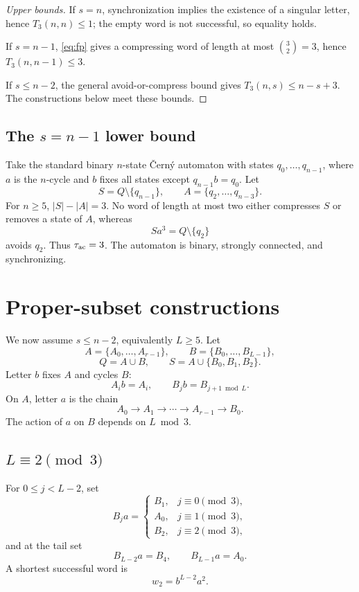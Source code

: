 \documentclass[11pt]{article}
\theoremstyle{definition}
\theoremstyle{remark}
\newcommand{\tauac}{\tau_{\rm ac}}
\begin{document}
\begin{proof}[Upper bounds]
If $s=n$, synchronization implies the existence of a singular letter, hence $T_3(n,n)\le1$; the empty word is not successful, so equality holds.

If $s=n-1$, \eqref{eq:fp} gives a compressing word of length at most $\binom32=3$, hence $T_3(n,n-1)\le3$.

If $s\le n-2$, the general avoid-or-compress bound gives $T_3(n,s)\le n-s+3$. The constructions below meet these bounds.
\end{proof}

\subsection{The $s=n-1$ lower bound}
Take the standard binary $n$-state \v{C}ern\'y automaton with states $q_0,\ldots,q_{n-1}$, where $a$ is the $n$-cycle and $b$ fixes all states except $q_{n-1}b=q_0$. Let
\[
S=Q\setminus\{q_{n-1}\},\qquad A=\{q_2,\ldots,q_{n-3}\}.
\]
For $n\ge5$, $|S|-|A|=3$. No word of length at most two either compresses $S$ or removes a state of $A$, whereas
\[
Sa^3=Q\setminus\{q_2\}
\]
avoids $q_2$. Thus $\tauac=3$. The automaton is binary, strongly connected, and synchronizing.

\section{Proper-subset constructions}
We now assume $s\le n-2$, equivalently $L\ge5$. Let
\[
A=\{A_0,\ldots,A_{r-1}\},\qquad B=\{B_0,\ldots,B_{L-1}\},
\]
\[
Q=A\cup B,\qquad S=A\cup\{B_0,B_1,B_2\}.
\]
Letter $b$ fixes $A$ and cycles $B$:
\[
A_i b=A_i,\qquad B_j b=B_{j+1\bmod L}.
\]
On $A$, letter $a$ is the chain
\[
A_0\to A_1\to\cdots\to A_{r-1}\to B_0.
\]
The action of $a$ on $B$ depends on $L\bmod3$.

\subsection{$L\equiv2\pmod3$}
For $0\le j<L-2$, set
\[
B_j a=\begin{cases}
B_1,&j\equiv0\pmod3,\\
A_0,&j\equiv1\pmod3,\\
B_2,&j\equiv2\pmod3,
\end{cases}
\]
and at the tail set
\[
B_{L-2}a=B_4,\qquad B_{L-1}a=A_0.
\]
A shortest successful word is
\begin{equation}\label{eq:w2}
w_2=b^{L-2}a^2.
\end{equation}
\end{document}

